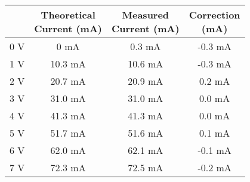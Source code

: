 \begin{tabular}{ | c | c | c | c | } \hline
	\thead{Voltage (V)} & \thead{Theoretical \\ Current (mA)} & \thead{Measured \\ Current (mA)} & \thead{Correction \\ (mA)} \\ \hline
	0 V & 0 mA & 0.3 mA & -0.3 mA \\ \hline
	1 V & 10.3 mA & 10.6 mA & -0.3 mA \\ \hline
	2 V & 20.7 mA & 20.9 mA & 0.2 mA \\ \hline
	3 V & 31.0 mA & 31.0 mA & 0.0 mA \\ \hline
	4 V & 41.3 mA & 41.3 mA & 0.0 mA \\ \hline
	5 V & 51.7 mA & 51.6 mA & 0.1 mA \\ \hline
	6 V & 62.0 mA & 62.1 mA & -0.1 mA \\ \hline
	7 V & 72.3 mA & 72.5 mA & -0.2 mA \\ \hline
\end{tabular}